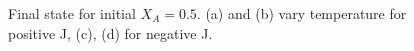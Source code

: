 \documentclass{report}
\begin{document}
        \begin{figure}[!htb]
            \label{fig:Ising-alloy-0.5}
            \caption{Final state for initial $X_A = 0.5$. (a) and (b) vary temperature for positive J, (c), (d) for negative J.}
        \end{figure}
\end{document}
